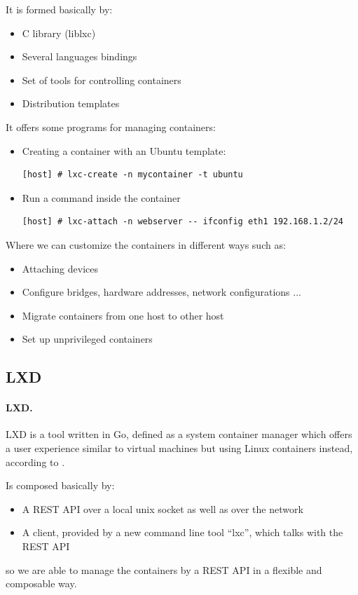It is formed basically by:
\begin{itemize}
	\item{C library (liblxc)}
	\item{Several languages bindings}
	\item{Set of tools for controlling containers}
	\item{Distribution templates}
\end{itemize}

It offers some programs for managing containers:
\begin{itemize}
	\item{Creating a container with an Ubuntu template}:
	      \begin{verbatim}
[host] # lxc-create -n mycontainer -t ubuntu
	\end{verbatim}
	\item{Run a command inside the container}
	      \begin{verbatim}
[host] # lxc-attach -n webserver -- ifconfig eth1 192.168.1.2/24
	\end{verbatim}
\end{itemize}

Where we can customize the containers in different ways such as:
\begin{itemize}
	\item{Attaching devices}
	\item{Configure bridges, hardware addresses, network configurations ...}
	\item{Migrate containers from one host to other host}
	\item{Set up unprivileged containers}
\end{itemize}

\subsection{LXD}
\paragraph{LXD.} LXD is a tool written in Go, defined as a system container manager which offers a user experience similar to virtual machines but using Linux containers instead, according to \cite{lxd}.

Is composed basically by:
\begin{itemize}
	\item{A REST API over a local unix socket as well as over the network}
	\item{A client, provided by a new command line tool ``lxc'', which talks with the REST API}
\end{itemize}
so we are able to manage the containers by a REST API in a flexible and composable way.


